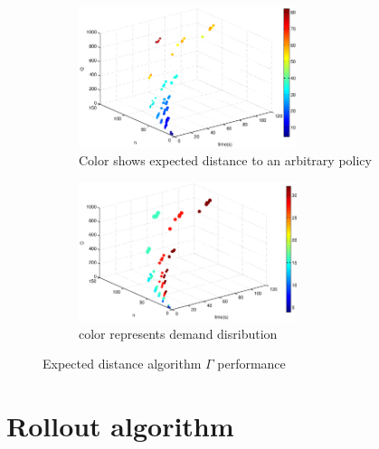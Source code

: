 \begin{figure}[!htbp]
  \begin{center}
  \begin{subfigure}[h]{1\textwidth}
   \includegraphics[width=0.7\textwidth]{Images/Chapter5/expected_distance3D.eps}
   \caption{Color shows expected distance to an arbitrary policy }\label{fig:expected_distance3D_time}
  \end{subfigure}
  \begin{subfigure}[h]{1\textwidth}
   \includegraphics[width=0.7\textwidth]{Images/Chapter5/expected_distance3D_range.eps}
   \caption{color represents demand disribution}\label{fig:expected_distance3D_range_time}
  \end{subfigure}
   
  \end{center}
    \caption{Expected distance algorithm  $\Gamma$ performance}\label{fig:expected_distance3D}
\end{figure}

\clearpage

\section{Rollout algorithm}


